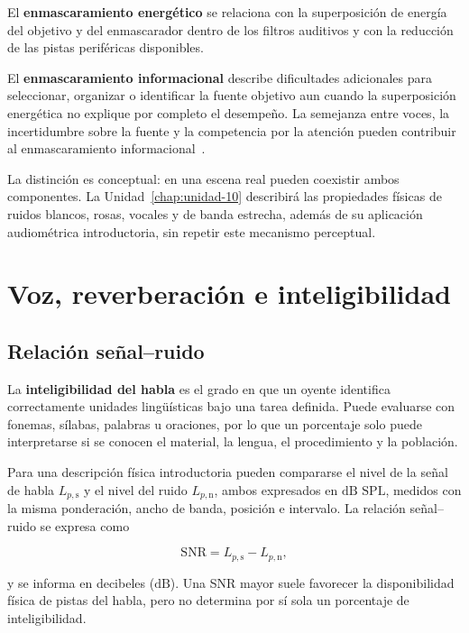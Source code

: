 El \textbf{enmascaramiento energético} se relaciona con la superposición de
energía del objetivo y del enmascarador dentro de los filtros auditivos y con
la reducción de las pistas periféricas disponibles.

El \textbf{enmascaramiento informacional} describe dificultades adicionales
para seleccionar, organizar o identificar la fuente objetivo aun cuando la
superposición energética no explique por completo el desempeño.
La semejanza entre voces, la incertidumbre sobre la fuente y la
competencia por la atención pueden contribuir al enmascaramiento
informacional~\cite{moore2008,bronkhorst2000}.

La distinción es conceptual: en una escena real pueden coexistir ambos
componentes. La Unidad~\ref{chap:unidad-10} describirá las propiedades físicas de ruidos
blancos, rosas, vocales y de banda estrecha, además de su aplicación
audiométrica introductoria, sin repetir este mecanismo perceptual.

\section{Voz, reverberación e inteligibilidad}
\label{sec:u7-inteligibilidad}

\subsection{Relación señal--ruido}
\label{sec:u7-snr}

La \textbf{inteligibilidad del habla} es el grado en que un oyente identifica
correctamente unidades lingüísticas bajo una tarea definida. Puede evaluarse
con fonemas, sílabas, palabras u oraciones, por lo que un porcentaje solo puede
interpretarse si se conocen el material, la lengua, el procedimiento y la
población.

Para una descripción física introductoria pueden compararse el nivel de la
señal de habla \(L_{p,\mathrm{s}}\) y el nivel del ruido
\(L_{p,\mathrm{n}}\), ambos expresados en \(\text{dB SPL}\), medidos con la
misma ponderación, ancho de banda, posición e intervalo. La relación
señal--ruido se expresa como

\begin{equation}
    \mathrm{SNR}
      =L_{p,\mathrm{s}}-L_{p,\mathrm{n}},
    \label{eq:u7-snr}
\end{equation}

y se informa en decibeles (\(\text{dB}\)). Una SNR mayor suele favorecer la
disponibilidad física de pistas del habla, pero no determina por sí sola un
porcentaje de inteligibilidad.

